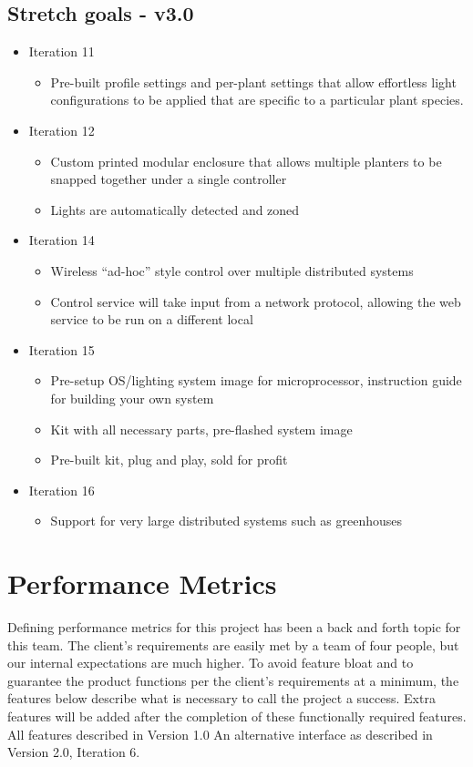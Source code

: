 \documentclass[onecolumn, draftclsnofoot,10pt, compsoc]{IEEEtran}
\begin{document}
		\subsection*{Stretch goals - v3.0}
			\begin{itemize}
				\item Iteration 11
					\begin{itemize}
						\item Pre-built profile settings and per-plant settings that allow effortless light configurations to be applied that are specific to a particular plant species.
					\end{itemize}
				\item Iteration 12
					\begin{itemize}
						\item Custom printed modular enclosure that allows multiple planters to be snapped together under a single controller
						\item Lights are automatically detected and zoned
					\end{itemize}
				\item Iteration 14
					\begin{itemize}
						\item Wireless “ad-hoc” style control over multiple distributed systems
						\item Control service will take input from a network protocol, allowing the web service to be run on a different local
					\end{itemize}
				\item Iteration 15
					\begin{itemize}
						\item Pre-setup OS/lighting system image for microprocessor, instruction guide for building your own system
						\item Kit with all necessary parts, pre-flashed system image
						\item Pre-built kit, plug and play, sold for profit
					\end{itemize}
				\item Iteration 16
					\begin{itemize}
						\item Support for very large distributed systems such as greenhouses
					\end{itemize}
			\end{itemize}

		\section*{Performance Metrics}
		Defining performance metrics for this project has been a back and forth topic for this team. The client's requirements are easily met by a team of four people, but our internal expectations are much higher. To avoid feature bloat and
		to guarantee the product functions per the client's requirements at a minimum, the features below describe what is necessary to call the project a success. Extra features will be added after the completion of these functionally required
		features.
		All features described in Version 1.0
		An alternative interface as described in Version 2.0, Iteration 6.
\end{document}
